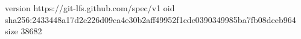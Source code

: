 version https://git-lfs.github.com/spec/v1
oid sha256:2433448a17d2e226d09ca4e30b2aff49952f1cde0390349985ba7fb08dceb964
size 38682

